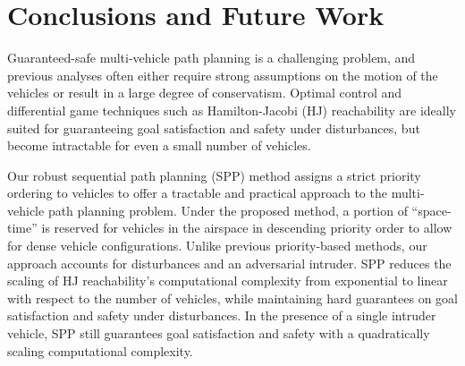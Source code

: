 \section{Conclusions and Future Work}
Guaranteed-safe multi-vehicle path planning is a challenging problem, and previous analyses often either require strong assumptions on the motion of the vehicles or result in a large degree of conservatism. Optimal control and differential game techniques such as Hamilton-Jacobi (HJ) reachability are ideally suited for guaranteeing goal satisfaction and safety under disturbances, but become intractable for even a small number of vehicles.

Our robust sequential path planning (SPP) method assigns a strict priority ordering to vehicles to offer a tractable and practical approach to the multi-vehicle path planning problem. Under the proposed method, a portion of ``space-time'' is reserved for vehicles in the airspace in descending priority order to allow for dense vehicle configurations. Unlike previous priority-based methods, our approach accounts for disturbances and an adversarial intruder. SPP reduces the scaling of HJ reachability's computational complexity from exponential to linear with respect to the number of vehicles, while maintaining hard guarantees on goal satisfaction and safety under disturbances. In the presence of a single intruder vehicle, SPP still guarantees goal satisfaction and safety with a quadratically scaling computational complexity.
